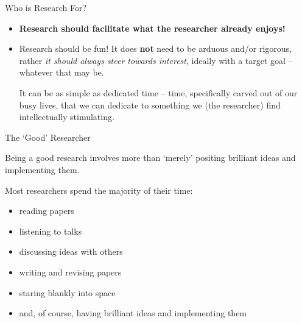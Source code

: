 \begin{frame}{Who is Research For?}
    \vspace{2em}%
    \begin{itemize}
        \item \textbf{Research should facilitate what the researcher already enjoys!}\vspace{1.5em}%
        \item Research should be fun! It does \textbf{not} need to be arduous and/or rigorous, rather \textit{it should always steer
            towards interest}, ideally with a target goal -- whatever that may be.\vspace{1em}%
            
            It can be as simple as dedicated time -- time, specifically carved out of our busy lives, that 
            we can dedicate to something we (the researcher) find intellectually stimulating.%
    \end{itemize} 

\end{frame}


\begin{frame}{The `Good' Researcher}

    \begin{center}
        Being a good research involves more than `merely' positing brilliant ideas and implementing them.\vspace{2em}%
    \end{center}

    Most researchers spend the majority of their time:\vspace{1em}
    \begin{itemize}
        \item reading papers\vspace{0.5em}
        \item listening to talks\vspace{0.5em}
        \item discussing ideas with others\vspace{0.5em}
        \item writing and revising papers\vspace{0.5em}
        \item staring blankly into space\vspace{0.5em}
        \item \small{and, of course, having brilliant ideas and implementing them}\vspace{0.5em}
    \end{itemize}
\end{frame}

